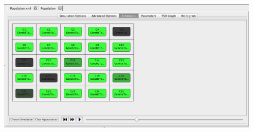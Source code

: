 \documentclass[titlepage,11pt]{article}
\begin{document}
\begin{center}
\includegraphics[width=160mm]{screenshots/gridSimResultsGT}
\end{center}
\end{document}
